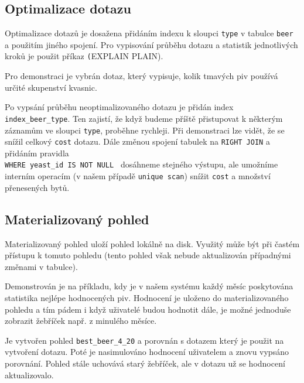 \documentclass[a4paper, 11pt]{article}
\begin{document}
\subsection{Optimalizace dotazu}

Optimalizace dotazů je dosažena přidáním indexu k sloupci \texttt{type} v tabulce \texttt{beer} a použitím jiného spojení. Pro vypisování průběhu dotazu a statistik jednotlivých kroků je použit příkaz \texttt(EXPLAIN PLAIN).


Pro demonstraci je vybrán dotaz, který vypisuje, kolik tmavých piv používá určité skupenství kvasnic.


Po vypsání průběhu neoptimalizovaného dotazu je přidán index \texttt{index\_beer\_type}. Ten zajistí, že když budeme příště přistupovat k některým záznamům ve sloupci \texttt{type}, proběhne rychleji. Při demonstraci lze vidět, že se snížil celkový \texttt{cost} dotazu. Dále změnou spojení tabulek na \texttt{RIGHT JOIN} a přidáním pravidla\\ \texttt{WHERE yeast\_id IS NOT NULL } dosáhneme stejného výstupu, ale umožníme interním operacím (v našem případě \texttt{unique scan}) snížit \texttt{cost} a množství přenesených bytů.

\subsection{Materializovaný pohled}
Materializovaný pohled uloží pohled lokálně na disk. Využitý může být při častém přístupu k tomuto pohledu (tento pohled však nebude aktualizován případnými změnami v tabulce).


Demonstrován je na příkladu, kdy je v našem systému každý měsíc poskytována statistika nejlépe hodnocených piv. Hodnocení je uloženo do materializovaného pohledu a tím pádem i když uživatelé budou hodnotit dále, je možné jednoduše zobrazit žebříček např. z minulého měsíce.


Je vytvořen pohled \texttt{best\_beer\_4\_20} a porovnán s dotazem který je použit na vytvoření dotazu.
Poté je nasimulováno hodnocení uživatelem a znovu vypsáno porovnání. Pohled stále uchovává starý žebříček, ale v dotazu už se hodnocení aktualizovalo.

 
\end{document}

